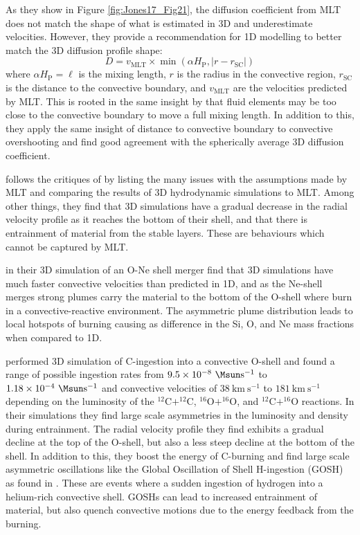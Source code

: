 As they show in Figure \ref{fig:Jones17_Fig21}, the diffusion coefficient from MLT does not match the shape of what is estimated in 3D and underestimate velocities.
However, they provide a recommendation for 1D modelling to better match the 3D diffusion profile shape:
\begin{equation}
    D = v_{\mathrm{MLT}}\times\min(\alpha H_\mathrm{P},|r-r_{\mathrm{SC}}|)
\end{equation}
where $\alpha H_\mathrm{{P}}=\ell$ is the mixing length, $r$ is the radius in the convective region, $r_{\mathrm{SC}}$ is the distance to the convective boundary, and $v_{\mathrm{MLT}}$ are the velocities predicted by MLT.
This is rooted in the same insight by \cite{meakinTurbulentConvectionStellar2007} that fluid elements may be too close to the convective boundary to move a full mixing length.
In addition to this, they apply the same insight of distance to convective boundary to convective overshooting and find good agreement with the spherically average 3D diffusion coefficient.

\cite{arnett3DSimulationsMLT2019} follows the critiques of \cite{renziniEmbarrassmentsCurrentTreatments1987} by listing the many issues with the assumptions made by MLT and comparing the results of 3D hydrodynamic simulations to MLT.
Among other things, they find that 3D simulations have a gradual decrease in the radial velocity profile as it reaches the bottom of their shell, and that there is entrainment of material from the stable layers.
These are behaviours which cannot be captured by MLT.

\cite{yadavLargescaleMixingViolent2020a} in their 3D simulation of an O-Ne shell merger find that 3D simulations have much faster convective velocities than predicted in 1D, and as the Ne-shell merges strong plumes carry the material to the bottom of the O-shell where burn in a convective-reactive environment.
The asymmetric plume distribution leads to local hotspots of burning causing as difference in the Si, O, and Ne mass fractions when compared to 1D.

\cite{andrassy3DHydrodynamicSimulations2020} performed 3D simulation of C-ingestion into a convective O-shell and found a range of possible ingestion rates from $9.5\times10^{-8}~\mathrm{\Msun s^{-1}}$ to $1.18\times10^{-4}~\mathrm{\Msun s^{-1}}$ and convective velocities of $38~\mathrm{km~s^{-1}}$ to $181~\mathrm{km~s^{-1}}$ depending on the luminosity of the $^{12}\mathrm{C}+^{12}\mathrm{C}$, $^{16}\mathrm{O}+^{16}\mathrm{O}$, and $^{12}\mathrm{C}+^{16}\mathrm{O}$ reactions.
In their simulations they find large scale asymmetries in the luminosity and density during entrainment.
The radial velocity profile they find exhibits a gradual decline at the top of the O-shell, but also a less steep decline at the bottom of the shell.
In addition to this, they boost the energy of C-burning and find large scale asymmetric oscillations like the Global Oscillation of Shell H-ingestion (GOSH) as found in \cite{herwigGLOBALNONSPHERICALOSCILLATIONS2014}.
These are events where a sudden ingestion of hydrogen into a helium-rich convective shell.
GOSHs can lead to increased entrainment of material, but also quench convective motions due to the energy feedback from the burning.

